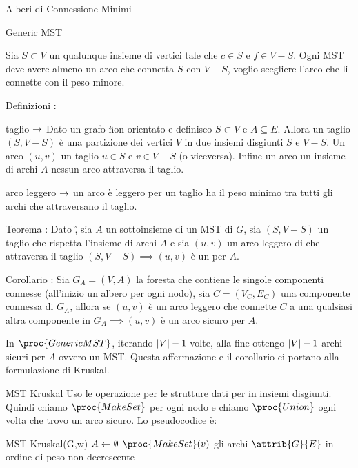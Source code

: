 \documentclass[8pt]{extarticle}
\begin{document}
\begin{formulario}
\begin{myParagraphEnd}{Alberi di Connessione Minimi}
\begin{subParagraph}{Generic MST}
\begin{Descr}
Sia $S\subset V$ un qualunque insieme di vertici tale che $c\in S$ e $f\in V-S$. Ogni MST deve avere almeno un arco che connetta $S$ con $V-S$, voglio scegliere l'arco che li connette con il peso minore.
				\item[Definizioni]:\\
				\begin{Descr} 
					\item[taglio] $\rightarrow$ Dato un grafo \G non orientato e definisco $S\subset V$ e $A\subseteq E$. Allora un taglio $(S,V-S)$ è una partizione dei vertici $V$ in due insiemi disgiunti $S$ e $V-S$. Un arco $(u,v)$  un taglio \SSE $u\in S$ e $v\in V-S$ (o viceversa). Infine un arco  un insieme di archi $A$ \SSE nessun arco attraversa il taglio. 
					\item[arco leggero] $\rightarrow$ un arco è leggero per un taglio \SSE ha il peso minimo tra tutti gli archi che attraversano il taglio.
				\end{Descr}
				\item[Teorema]: Dato \G, sia $A$ un sottoinsieme di un MST di $G$, sia $(S,V-S)$ un taglio che rispetta l'insieme di archi $A$ e sia $(u,v)$ un arco leggero di che attraversa il taglio $(S,V-S)\implies (u,v)$ è un  per $A$.
				\item[Corollario]: Sia $G_A=(V,A)$ la foresta che contiene le singole componenti connesse (all'inizio un albero per ogni nodo), sia $C=(V_C,E_C)$ una componente connessa di $G_A$, allora se $(u,v)$ è un arco leggero che connette $C$ a una qualsiasi altra componente in $G_A\implies(u,v)$ è un arco sicuro per $A$.
			\end{Descr}
In $\proc{GenericMST}$, iterando $\left\vert V \right\vert-1$ volte, alla fine ottengo $\left\vert V \right\vert-1$ archi sicuri per $A$ ovvero un MST. Questa affermazione e il corollario ci portano alla formulazione di Kruskal.
		\end{subParagraph}
		\begin{subParagraph}{MST Kruskal}
Uso le operazione per le strutture dati per in insiemi disgiunti. Quindi chiamo $\proc{MakeSet}$ per ogni nodo e chiamo $\proc{Union}$ ogni volta che trovo un arco sicuro. Lo pseudocodice è:
			\begin{code}{MST-Kruskal(G,w)}
\li $A\leftarrow\emptyset$
\li {}
	\li $\proc{MakeSet}(v)$
\END
\li {} gli archi $\attrib{G}{E}$ in ordine di peso non decrescente
\li {}

\end{code}
\end{subParagraph}
\end{myParagraphEnd}
\end{formulario}
\end{document}
